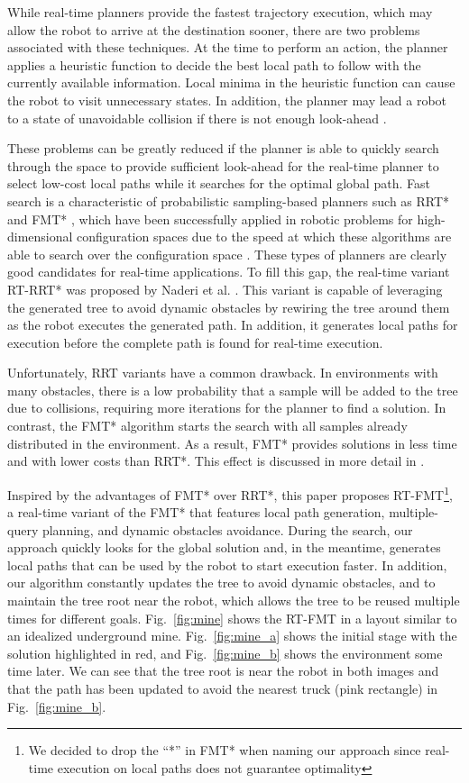 While real-time planners provide the fastest trajectory execution, which may allow the robot to arrive at the destination sooner, there are two problems associated with these techniques. At the time to perform an action, the planner applies a heuristic function to decide the best local path to follow with the currently available information. Local minima in the heuristic function can cause the robot to visit unnecessary states. In addition, the planner may lead a robot to a state of unavoidable collision if there is not enough look-ahead \cite{cserna2016anytime}.

These problems can be greatly reduced if the planner is able to quickly search through the space to provide sufficient look-ahead for the real-time planner to select low-cost local paths while it searches for the optimal global path. Fast search is a characteristic of probabilistic sampling-based planners such as RRT* \cite{karaman2011sampling} and FMT* \cite{fmt}, which have been successfully applied in robotic problems for high-dimensional configuration spaces due to the speed at which these algorithms are able to search over the configuration space \cite{karaman2011sampling}. These types of planners are clearly good candidates for real-time applications. To fill this gap, the real-time variant RT-RRT* was proposed by Naderi et al. \cite{naderi2015rt}. This variant is capable of leveraging the generated tree to avoid dynamic obstacles by rewiring the tree around them as the robot executes the generated path. In addition, it generates local paths for execution before the complete path is found for real-time execution. 

Unfortunately, RRT variants have a common drawback. In environments with many obstacles, there is a low probability that a sample will be added to the tree due to collisions, requiring more iterations for the planner to find a solution. In contrast, the FMT* algorithm starts the search with all samples already distributed in the environment. As a result, FMT* provides solutions in less time and with lower costs than RRT*. This effect is discussed in more detail in \cite{fmt}. 

Inspired by the advantages of FMT* over RRT*, this paper proposes RT-FMT\footnote{We decided to drop the ``*'' in FMT* when naming our approach since real-time execution on local paths does not guarantee optimality}, a real-time variant of the FMT* that features local path generation, multiple-query planning, and dynamic obstacles avoidance. During the search, our approach quickly looks for the global solution and, in the meantime, generates local paths that can be used by the robot to start execution faster. In addition, our algorithm constantly updates the tree to avoid dynamic obstacles, and to maintain the tree root near the robot, which allows the tree to be reused multiple times for different goals. Fig.~\ref{fig:mine} shows the RT-FMT in a layout similar to an idealized underground mine.  Fig.~\ref{fig:mine_a} shows the initial stage with the solution highlighted in red, and Fig.~\ref{fig:mine_b} shows the environment some time later. We can see that the tree root is near the robot in both images and that the path has been updated to avoid the nearest truck (pink rectangle) in Fig.~\ref{fig:mine_b}. 

